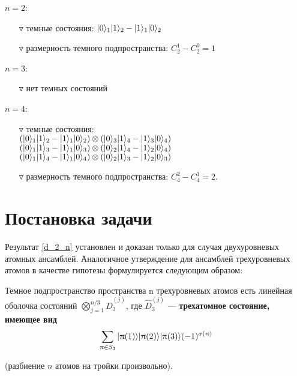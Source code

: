 \noindent
$n = 2$:
\begin{itemize}
	\item[$\triangledown$]{темные состояния: $|0\rangle_{1}|1\rangle_{2} - |1\rangle_{1}|0\rangle_{2}$}
	\item[$\triangledown$]{размерность темного подпространства: $C_{2}^{1} - C_{2}^{0} = 1$\\}
\end{itemize}
$n = 3$:
\begin{itemize}
	\item[$\triangledown$]{нет темных состояний\\}
\end{itemize}
$n = 4$:
\begin{itemize}
	\item[$\triangledown$]{
		темные состояния:\\
		$(|0\rangle_{1}|1\rangle_{2} - |1\rangle_{1}|0\rangle_{2})\otimes(|0\rangle_{3}|1\rangle_{4} - |1\rangle_{3}|0\rangle_{4})$\\
		$(|0\rangle_{1}|1\rangle_{3} - |1\rangle_{1}|0\rangle_{3})\otimes(|0\rangle_{2}|1\rangle_{4} - |1\rangle_{2}|0\rangle_{4})$\\
		$(|0\rangle_{1}|1\rangle_{4} - |1\rangle_{1}|0\rangle_{4})\otimes(|0\rangle_{2}|1\rangle_{3} - |1\rangle_{2}|0\rangle_{3})$
	}
	\item[$\triangledown$]{размерность темного подпространства: $C_{4}^{2} - C_{4}^{1} = 2$.}
\end{itemize}

\section{Постановка задачи}\label{sec:ch4/sect2}
Результат \eqref{d_2_n} установлен и доказан только для случая двухуровневых атомных ансамблей. Аналогичное утверждение для ансамблей трехуровневых
атомов в качестве гипотезы формулируется следующим образом:
\begin{hyp}
	\label{Th:20}Темное подпространство пространства n трехуровневых атомов есть линейная оболочка состояний $\displaystyle \bigotimes_{j=1}^{n/3}{\widehat{D}_{3}^{(j)}}$,
	где $\widehat{D}_{3}^{(j)}$ --- \textbf{трехатомное состояние, имеющее вид}
	\begin{equation}
		\sum_{\uppi \in S_{3}}|\uppi(1)\rangle|\uppi(2)\rangle|\uppi(3)\rangle(-1)^{\sigma(\uppi)}
	\end{equation}
	\begin{center}(разбиение $n$ атомов на тройки произвольно).\end{center}
\end{hyp}

